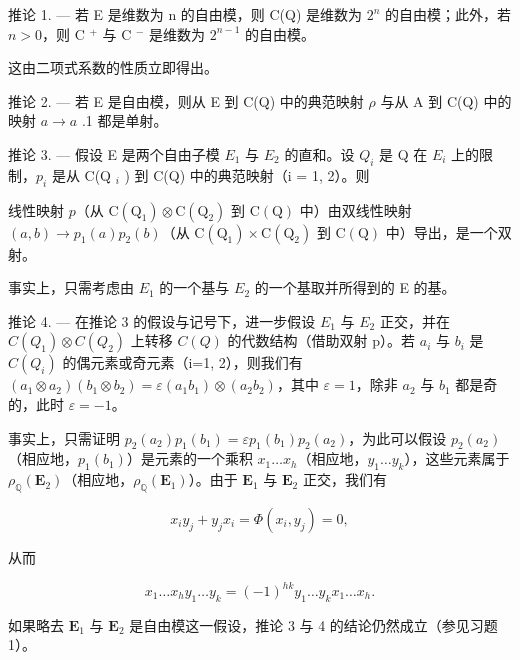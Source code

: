 推论 1. --- 若 E 是维数为 n 的自由模，则 C(Q) 是维数为 \(2^{n}\) 的自由模；此外，若 \(n > 0\)，则 C \(^{+}\) 与 C \(^{-}\) 是维数为 \(2^{n-1}\) 的自由模。

  这由二项式系数的性质立即得出。

推论 2. --- 若 E 是自由模，则从 E 到 C(Q) 中的典范映射 \(\rho\) 与从 A 到 C(Q) 中的映射 \(a \to a\) .1 都是单射。

推论 3. --- 假设 E 是两个自由子模 \(E_{1}\) 与 \(E_{2}\) 的直和。设 \(Q_{i}\) 是 Q 在 \(E_{i}\) 上的限制，\(p_{i}\) 是从 C(Q \(_{i}\) ) 到 C(Q) 中的典范映射（i = 1, 2）。则

线性映射 \(p\)（从 \(\mathrm{C(Q_{1})\otimes C(Q_{2})}\) 到 \(\mathrm{C(Q)}\) 中）由双线性映射 \((a,b)\to p_{1}(a)p_{2}(b)\)（从 \(\mathrm{C(Q_{1})\times C(Q_{2})}\) 到 \(\mathrm{C(Q)}\) 中）导出，是一个双射。

  事实上，只需考虑由 \(E_{1}\) 的一个基与 \(E_{2}\) 的一个基取并所得到的 E 的基。

推论 4. --- 在推论 3 的假设与记号下，进一步假设 \(E_{1}\) 与 \(E_{2}\) 正交，并在 \(C(Q_{1})\otimes C(Q_{2})\) 上转移 \(C(Q)\) 的代数结构（借助双射 p）。若 \(a_{i}\) 与 \(b_{i}\) 是 \(C(Q_{i})\) 的偶元素或奇元素（i=1, 2），则我们有 \((a_{1}\otimes a_{2})(b_{1}\otimes b_{2})=\varepsilon(a_{1}b_{1})\otimes(a_{2}b_{2})\)，其中 \(\varepsilon=1\)，除非 \(a_{2}\) 与 \(b_{1}\) 都是奇的，此时 \(\varepsilon=-1\)。

  事实上，只需证明 \(p_2(a_2)p_1(b_1) = \varepsilon p_1(b_1)p_2(a_2)\)，为此可以假设 \(p_2(a_2)\)（相应地，\(p_1(b_1)\)）是元素的一个乘积 \(x_1 \ldots x_h\)（相应地，\(y_1 \ldots y_k\)），这些元素属于 \(\rho_{\mathbb{Q}}(\mathbf{E}_2)\)（相应地，\(\rho_{\mathbb{Q}}(\mathbf{E}_1)\)）。由于 \(\mathbf{E}_1\) 与 \(\mathbf{E}_2\) 正交，我们有

\[
x _ {i} y _ {j} + y _ {j} x _ {i} = \Phi (x _ {i}, y _ {j}) = 0,
\]

  从而

\[
x _ {1} \dots x _ {h} y _ {1} \dots y _ {k} = (- 1) ^ {h k} y _ {1} \dots y _ {k} x _ {1} \dots x _ {h}.
\]

  如果略去 \(\mathbf{E}_1\) 与 \(\mathbf{E}_2\) 是自由模这一假设，推论 3 与 4 的结论仍然成立（参见习题 1）。

